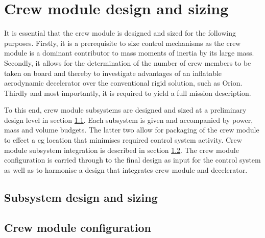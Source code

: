 \section{Crew module design and sizing}\label{ch:crewmod}
It is essential that the crew module is designed and sized for the following purposes. Firstly, it is a prerequisite to size control mechanisms as the crew module is a dominant contributor to mass moments of inertia by its large mass. Secondly, it allows for the determination of the number of crew members to be taken on board and thereby to investigate advantages of an inflatable aerodynamic decelerator over the conventional rigid solution, such as Orion. Thirdly and most importantly, it is required to yield a full mission description.

To this end, crew module subsystems are designed and sized at a preliminary design level in section \ref{sec:crewsubsys}. Each subsystem is given and accompanied by power, mass and volume budgets. The latter two allow for packaging of the crew module to effect a \gls{cg} location that minimises required control system activity. Crew module subsystem integration is described in section \ref{sec:crewpackaging}. The crew module configuration is carried through to the final design as input for the control system as well as to harmonise a design that integrates crew module and decelerator.

\subsection{Subsystem design and sizing} \label{sec:crewsubsys}


\subsection{Crew module configuration} \label{sec:crewpackaging}



